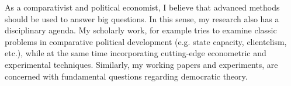 As a comparativist and political economist, I believe that advanced methods should be used to answer big questions. In this sense, my research also has a disciplinary agenda. My scholarly work, for example tries to examine classic problems in comparative political development (e.g. state capacity, clientelism, etc.), while at the same time incorporating cutting-edge econometric and experimental techniques. Similarly, my working papers and experiments, are concerned with fundamental questions regarding democratic theory.

